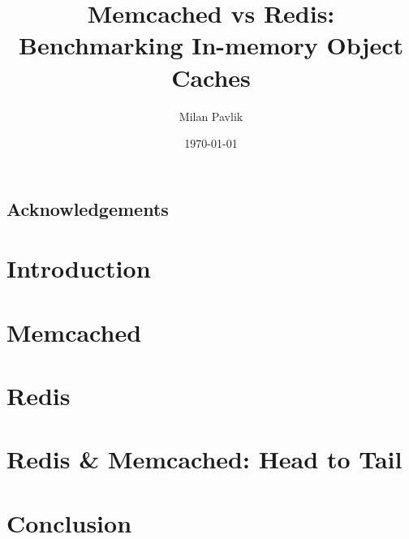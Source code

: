 \documentclass[bsc,frontabs,twoside,singlespacing,parskip,deptreport]{infthesis}
\begin{document}
\title{Memcached vs Redis: Benchmarking In-memory Object Caches}

\author{Milan Pavlik}



\date{\today}

\abstract{}

\maketitle

\section*{Acknowledgements}


\tableofcontents



\chapter{Introduction}





\chapter{Memcached}


\chapter{Redis}


\chapter{Redis \& Memcached: Head to Tail}


\chapter{Conclusion}







\end{document}
